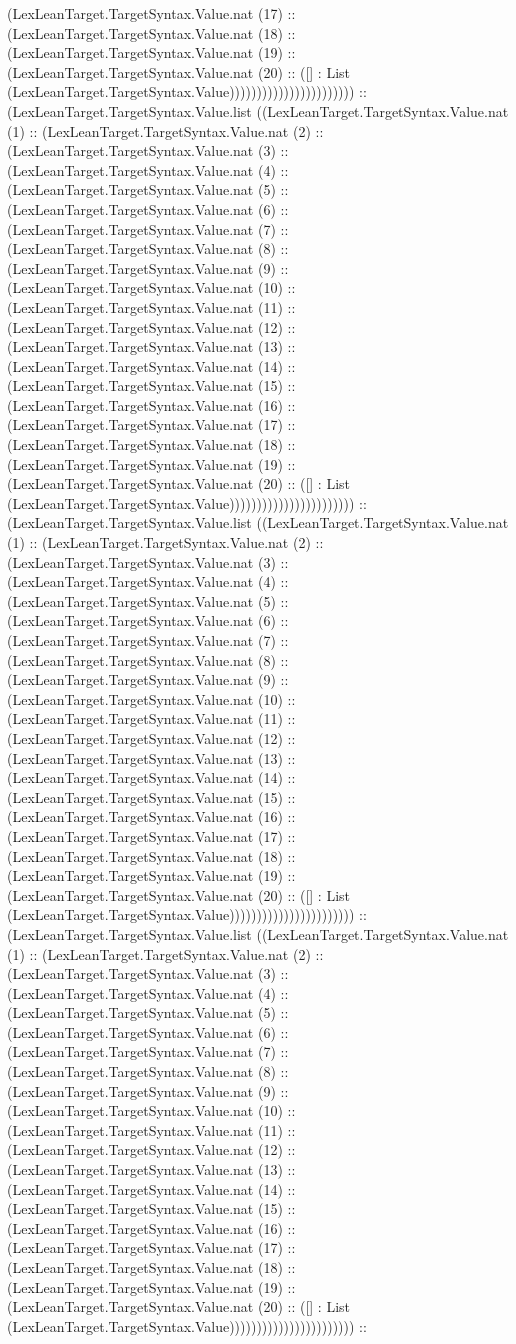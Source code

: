 \documentclass[11pt]{article}
\begin{document}
(LexLeanTarget.TargetSyntax.Value.nat (17) :: (LexLeanTarget.TargetSyntax.Value.nat (18) :: (LexLeanTarget.TargetSyntax.Value.nat (19) :: (LexLeanTarget.TargetSyntax.Value.nat (20) :: ([] : List (LexLeanTarget.TargetSyntax.Value))))))))))))))))))))))) :: (LexLeanTarget.TargetSyntax.Value.list ((LexLeanTarget.TargetSyntax.Value.nat (1) :: (LexLeanTarget.TargetSyntax.Value.nat (2) :: (LexLeanTarget.TargetSyntax.Value.nat (3) :: (LexLeanTarget.TargetSyntax.Value.nat (4) :: (LexLeanTarget.TargetSyntax.Value.nat (5) :: (LexLeanTarget.TargetSyntax.Value.nat (6) :: (LexLeanTarget.TargetSyntax.Value.nat (7) :: (LexLeanTarget.TargetSyntax.Value.nat (8) :: (LexLeanTarget.TargetSyntax.Value.nat (9) :: (LexLeanTarget.TargetSyntax.Value.nat (10) :: (LexLeanTarget.TargetSyntax.Value.nat (11) :: (LexLeanTarget.TargetSyntax.Value.nat (12) :: (LexLeanTarget.TargetSyntax.Value.nat (13) :: (LexLeanTarget.TargetSyntax.Value.nat (14) :: (LexLeanTarget.TargetSyntax.Value.nat (15) :: (LexLeanTarget.TargetSyntax.Value.nat (16) :: (LexLeanTarget.TargetSyntax.Value.nat (17) :: (LexLeanTarget.TargetSyntax.Value.nat (18) :: (LexLeanTarget.TargetSyntax.Value.nat (19) :: (LexLeanTarget.TargetSyntax.Value.nat (20) :: ([] : List (LexLeanTarget.TargetSyntax.Value))))))))))))))))))))))) :: (LexLeanTarget.TargetSyntax.Value.list ((LexLeanTarget.TargetSyntax.Value.nat (1) :: (LexLeanTarget.TargetSyntax.Value.nat (2) :: (LexLeanTarget.TargetSyntax.Value.nat (3) :: (LexLeanTarget.TargetSyntax.Value.nat (4) :: (LexLeanTarget.TargetSyntax.Value.nat (5) :: (LexLeanTarget.TargetSyntax.Value.nat (6) :: (LexLeanTarget.TargetSyntax.Value.nat (7) :: (LexLeanTarget.TargetSyntax.Value.nat (8) :: (LexLeanTarget.TargetSyntax.Value.nat (9) :: (LexLeanTarget.TargetSyntax.Value.nat (10) :: (LexLeanTarget.TargetSyntax.Value.nat (11) :: (LexLeanTarget.TargetSyntax.Value.nat (12) :: (LexLeanTarget.TargetSyntax.Value.nat (13) :: (LexLeanTarget.TargetSyntax.Value.nat (14) :: (LexLeanTarget.TargetSyntax.Value.nat (15) :: (LexLeanTarget.TargetSyntax.Value.nat (16) :: (LexLeanTarget.TargetSyntax.Value.nat (17) :: (LexLeanTarget.TargetSyntax.Value.nat (18) :: (LexLeanTarget.TargetSyntax.Value.nat (19) :: (LexLeanTarget.TargetSyntax.Value.nat (20) :: ([] : List (LexLeanTarget.TargetSyntax.Value))))))))))))))))))))))) :: (LexLeanTarget.TargetSyntax.Value.list ((LexLeanTarget.TargetSyntax.Value.nat (1) :: (LexLeanTarget.TargetSyntax.Value.nat (2) :: (LexLeanTarget.TargetSyntax.Value.nat (3) :: (LexLeanTarget.TargetSyntax.Value.nat (4) :: (LexLeanTarget.TargetSyntax.Value.nat (5) :: (LexLeanTarget.TargetSyntax.Value.nat (6) :: (LexLeanTarget.TargetSyntax.Value.nat (7) :: (LexLeanTarget.TargetSyntax.Value.nat (8) :: (LexLeanTarget.TargetSyntax.Value.nat (9) :: (LexLeanTarget.TargetSyntax.Value.nat (10) :: (LexLeanTarget.TargetSyntax.Value.nat (11) :: (LexLeanTarget.TargetSyntax.Value.nat (12) :: (LexLeanTarget.TargetSyntax.Value.nat (13) :: (LexLeanTarget.TargetSyntax.Value.nat (14) :: (LexLeanTarget.TargetSyntax.Value.nat (15) :: (LexLeanTarget.TargetSyntax.Value.nat (16) :: (LexLeanTarget.TargetSyntax.Value.nat (17) :: (LexLeanTarget.TargetSyntax.Value.nat (18) :: (LexLeanTarget.TargetSyntax.Value.nat (19) :: (LexLeanTarget.TargetSyntax.Value.nat (20) :: ([] : List (LexLeanTarget.TargetSyntax.Value))))))))))))))))))))))) :: 
\end{document}
